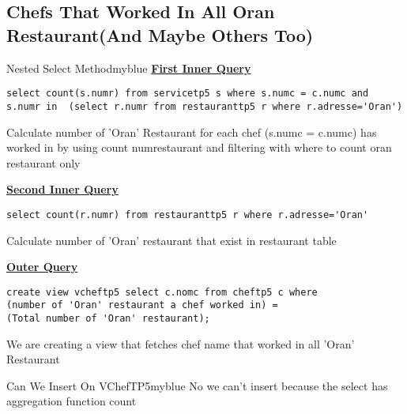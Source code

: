 \subsection*{Chefs That Worked In All Oran Restaurant(And Maybe Others Too)}


\begin{prettyBox}{Nested Select Method}{myblue}
\textbf{\underline{First Inner Query}}

\begin{lstlisting}
select count(s.numr) from servicetp5 s where s.numc = c.numc and
s.numr in  (select r.numr from restauranttp5 r where r.adresse='Oran')
\end{lstlisting}
Calculate number of 'Oran' Restaurant for each chef (s.numc = c.numc) has worked in 
by using count numrestaurant and filtering with where to count oran restaurant only
\vspace{0.15cm}

\textbf{\underline{Second Inner Query}}
\begin{lstlisting}
select count(r.numr) from restauranttp5 r where r.adresse='Oran'
\end{lstlisting}
Calculate number of 'Oran' restaurant that exist in restaurant table
\vspace{0.15cm}

\textbf{\underline{Outer Query}}

\begin{lstlisting}
create view vcheftp5 select c.nomc from cheftp5 c where 
(number of 'Oran' restaurant a chef worked in) = 
(Total number of 'Oran' restaurant);
\end{lstlisting}
We are creating a view that fetches chef name that worked in all 'Oran' Restaurant
\end{prettyBox}

\vspace{0.25cm}
\begin{prettyBox}{Can We Insert On VChefTP5}{myblue}
No we can't insert because the select has aggregation function count
\end{prettyBox}
